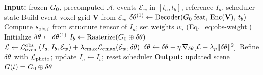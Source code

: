\begin{algorithm}[t]
\caption{EventGS online update (one window)}
\label{alg:online}
\begin{algorithmic}[1]
\State \textbf{Input:} frozen $G_0$, precomputed $\mathcal{A}$, events $\mathcal{E}_w$ in $[t_a,t_b]$, reference $I_a$, scheduler state
\State Build event voxel grid $\mathbf{V}$ from $\mathcal{E}_w$
\State $\delta\theta^{(1)} \gets \text{Decoder}(G_0.\text{feat},\, \text{Enc}(\mathbf{V}),\, t_b)$ 
\State Compute ${s_{\mathrm{obs}}}_i$ from structure tensor of $I_a$; set weights $w_i$ (Eq.~\ref{eq:obs-weight})
\State Initialize $\delta\theta \gets \delta\theta^{(1)}$
 
  \State $I_b \gets \text{Rasterize}(G_0 \oplus \delta\theta)$
  \State $\mathcal{L} \gets \mathcal{L}_{\text{event}}^{\text{obs}}(I_a,I_b,\mathcal{E}_w) + \lambda_{\text{cmax}}\mathcal{L}_{\text{cmax}}(\mathcal{E}_w,\delta\theta)$
  \State $\delta\theta \gets \delta\theta - \eta\,\nabla_{\delta\theta}[\mathcal{L} + \lambda_p\|\delta\theta\|^2]$
\EndFor
{} 
  \State Refine $\delta\theta$ with $\mathcal{L}_{\text{photo}}$; update $I_a \gets I_b$; reset scheduler
\EndIf
\State \textbf{Output:} updated scene $G(t)=G_0\oplus\delta\theta$
\end{algorithmic}
\end{algorithm}
